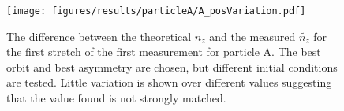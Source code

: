  
 \begin{figure}[H]
 \begin{center}
 \texttt{[image: figures/results/particleA/A\_posVariation.pdf]}
 \end{center}
 \caption{The difference between the theoretical $n_z$ and the measured $\widetilde{n_z}$ for the first stretch of the first measurement for particle A. The best orbit and best asymmetry are chosen, but different initial conditions are tested. Little variation is shown over different values suggesting that the value found is not strongly matched.}
 \label{fig:initVariation}
 \end{figure}
 

